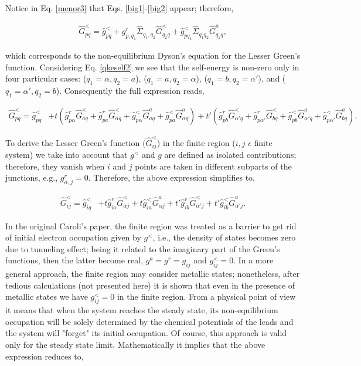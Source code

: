 \documentclass[10pt,prb,showpacs,amssymb,floatfix]{revtex4-1}
\newcommand{\alp}{\alpha}
\newcommand{\eps}{\epsilon}
\newcommand{\Sg}{\Sigma}
\newcommand{\h}{\hat}
\begin{document}
Notice in Eq. \eqref{menor3} that Eqs. \eqref{big1}-\eqref{big2} appear; therefore,

\begin{align}
\h G^<_{pq}=\h g^<_{pq} +  g^r_{p,q_1} \h \Sg_{q_1,q_2} \h G^<_{q_2 q} + \h g^<_{pq_1}\h \Sg_{q_1q_2} \h{G}^a_{q_2 q}, 
\label{menor3o}
\end{align}

which corresponds to the non-equilibrium Dyson's equation for the Lesser Green's function. Considering Eq. \eqref{qkeself2} we see that the self-energy is non-zero only in four particular cases: ($q_1=\alp,  q_2= a$), ($q_1=a,  q_2= \alp$), ($q_1=b,  q_2= \alp'$), and  ($q_1=\alp',  q_2= b$). Consequently the full expression reads,
 
 \begin{align}
 \label{fullself5}
 \h G^<_{pq} = \h g^<_{pq} &+ t(\h g^r_{p\alp}\h G^<_{aq} + \h g^r_{pa} \h G^<_{\alp q} +  \h g^<_{p\alp} \h{G}^a_{aq} + \h g^<_{pa}\h{G}^a_{\alp q})
  +t' (\h g^r_{pb}\h G^<_{\alp' q} + \h g^r_{p\alp'}\h G^<_{bq} +  \h g^<_{pb} \h{G}^a_{\alp' q} + \h g^<_{p\alp'}\h{G}^a_{bq}). 
 \end{align}
 
 To derive the Lesser Green's function $(\h G_{ij}^<$) in the finite region ($i,j$ $\eps$ finite system) we take into account that $g^<$ and $g$ are defined as isolated contributions; therefore, they vanish when $i$ and $j$ points are taken in different subparts of the junctions, e.g., $g^r_{\alp,j}=0$. Therefore, the above expression simplifies to,
 
  \begin{align}
 \label{fullself5o}
 \h G^<_{ij} = \h g^<_{iq} & + t \h g^r_{ia} \h G^<_{\alp j}  +t \h g^<_{ia}\h{G}^a_{\alp j} +t' \h g^r_{ib}\h G^<_{\alp' j}  + t' \h g^<_{ib} \h{G}^a_{\alp' j} . 
 \end{align}

In the original Caroli's paper,\cite{caroli} the finite region was treated as a barrier to get rid of initial electron occupation given by $g^<$, i.e., the density of states becomes zero due to tunneling effect; being it related to the imaginary part of the Green's functions, then the latter become real, $g^a = g^r = g_{ij}$ and $g^<_{ij}=0$. In a more general approach, the finite region may consider metallic states; nonetheless, after tedious calculations (not presented here) it is shown that even in the presence of metallic states we have $g^<_{ij}=0$ in the finite region. From a physical point of view it means that when the system reaches the steady state, its non-equilibrium occupation will be solely determined by the chemical potentials of the leads and the system will "forget" its initial occupation. Of course, this approach is valid only for the steady state limit. Mathematically it implies that the above expression reduces to,
\end{document}
